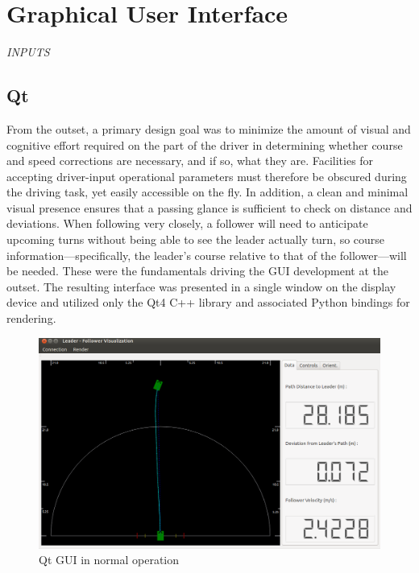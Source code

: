 \documentclass[twocolumn,10pt]{article}
\begin{document}

\section*{Graphical User Interface}


  \textit{INPUTS}

  \subsection*{Qt}
  
    From the outset, a primary design goal was to minimize the amount of visual and cognitive effort required on the part of the driver in determining whether course and speed corrections are necessary, and if so, what they are.  Facilities for accepting driver-input operational parameters must therefore be obscured during the driving task, yet easily accessible on the fly.  In addition, a clean and minimal visual presence ensures that a passing glance is sufficient to check on distance and deviations.  When following very closely, a follower will need to anticipate upcoming turns without being able to see the leader actually turn, so course information---specifically, the leader's course relative to that of the follower---will be needed.  These were the fundamentals driving the GUI development at the outset.  The resulting interface was presented in a single window on the display device and utilized only the Qt4 C++ library \cite{qt} and associated Python bindings for rendering.

    \begin{figure}[ht] \centering
      \includegraphics[width=\columnwidth] {../graphics/final_design_data.png}
      \caption{Qt GUI in normal operation} \label{fig:qt_normal}
    \end{figure}
\end{document}
